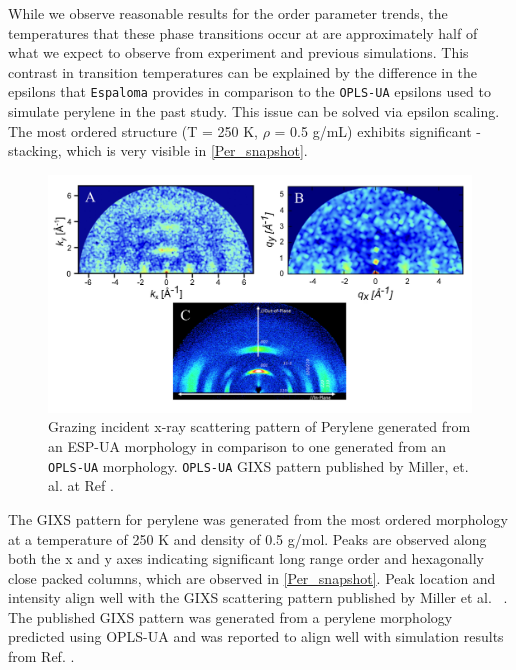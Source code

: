 \setlength{\parindent}{0cm}
While we observe reasonable results for the order parameter trends, the temperatures that these phase transitions occur at are approximately half of what we expect to observe from experiment and previous simulations. This contrast in transition temperatures can be explained by the difference in the epsilons that \texttt{Espaloma} provides in comparison to the \texttt{OPLS-UA} epsilons used to simulate perylene in the past study. This issue can be solved via epsilon scaling. The most ordered structure (T = 250 K, $\rho$ = 0.5 g/mL) exhibits significant \si{\pi}-stacking, which is very visible in \autoref{Per_snapshot}. 
\setlength{\parindent}{.6cm}
\begin{figure}[hbt!]
    \centering
    \includegraphics[width=.8\textwidth]{src/figures/FF_figs/per_GIXS.png} %
    \caption{Grazing incident x-ray scattering pattern of Perylene generated from an ESP-UA morphology in comparison to one generated from an \texttt{OPLS-UA} morphology. \texttt{OPLS-UA} GIXS pattern published by Miller, et. al. at Ref \citep{miller_enhanced_2017}.}
    \label{Per_GIXS}
\end{figure}
The GIXS pattern for perylene was generated from the most ordered morphology at a temperature of 250 K and density of 0.5 g/mol. Peaks are observed along both the x and y axes indicating significant long range order and hexagonally close packed columns, which are observed in \autoref{Per_snapshot}. Peak location and intensity align well with the GIXS scattering pattern published by Miller et al.~ \citep{miller_enhanced_2017}. The published GIXS pattern was generated from a perylene morphology predicted using OPLS-UA and was reported to align well with simulation results from Ref. \citep{Ishii}. 

